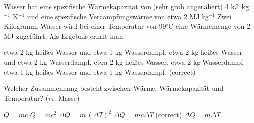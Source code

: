 \documentclass[11pt]{exam}
\begin{document}
\begin{questions}
\vspace{3mm}\question Wasser hat eine spezifische Wärmekapazität von (sehr grob angenähert) 4 kJ kg\(^{-1}\) K\(^{-1}\) und eine spezifische Verdampfungswärme von etwa 2 MJ kg\(^{-1}\).Zwei Kilogramm Wasser wird bei einer Temperatur von 99\(^\circ\)C eine Wärmemenge von 2 MJ zugeführt. Als Ergebnis erhält man

\begin{choices}
	\choice etwa 2 kg heißes Wasser und etwa 1 kg Wasserdampf.
	\choice etwa 2 kg heißes Wasser und etwa 2 kg Wasserdampf.
	\choice etwa 2 kg heißes Wasser.
	\choice etwa 2 kg Wasserdampf.
	\choice etwa 1 kg heißes Wasser und etwa 1 kg Wasserdampf. (correct)
\end{choices}

\vspace{3mm}\question Welcher Zusammenhang besteht zwischen Wärme, Wärmekapazität und Temperatur? (\(m\): Masse)

\begin{choices}
	\choice \(Q = m c\)
	\choice \(Q = m c^2\)
	\choice \(\Delta Q = m \, (\Delta T)^2\)
	\choice \(\Delta Q = m c \Delta T\) (correct)
	\choice \(\Delta Q = m \Delta T\)
\end{choices}

\vspace{3mm}\end{questions}
\end{document}
